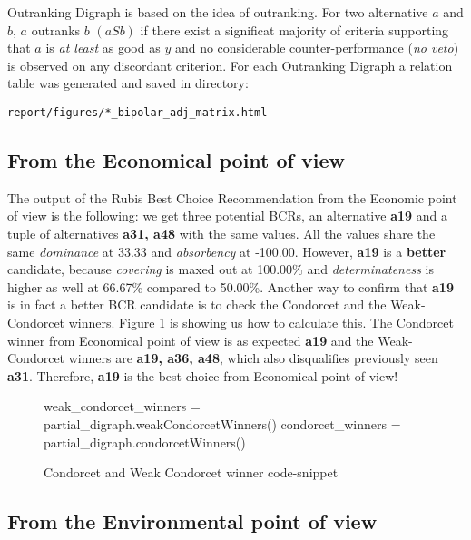 \documentclass[a4paper]{article}
\begin{document}
Outranking Digraph is based on the idea of outranking. For two alternative $a$ and $b$, $a$ outranks $b$ $(a S b)$ if there exist a significat majority of criteria supporting that $a$ is \emph{at least} as good as $y$ and no considerable counter-performance (\emph{no veto}) is observed on any discordant criterion. For each Outranking Digraph a relation table was generated and saved in directory:

\texttt{report/figures/*\_bipolar\_adj\_matrix.html} 

\subsection{From the Economical point of view}

The output of the Rubis Best Choice Recommendation from the Economic point of view is the following: we get three potential BCRs, an alternative \textbf{a19} and a tuple of alternatives \textbf{a31, a48} with the same values. All the values share the same \emph{dominance} at 33.33 and \emph{absorbency} at -100.00. However, \textbf{a19} is a \textbf{better} candidate, because \emph{covering} is maxed out at 100.00\% and \emph{determinateness} is higher as well at 66.67\% compared to 50.00\%. Another way to confirm that \textbf{a19} is in fact a better BCR candidate is to check the Condorcet and the Weak-Condorcet winners. Figure \ref{lst:condo} is showing us how to calculate this. The Condorcet winner from Economical point of view is as expected \textbf{a19} and the Weak-Condorcet winners are \textbf{a19, a36, a48}, which also disqualifies previously seen \textbf{a31}. Therefore, \textbf{a19} is the best choice from Economical point of view!

\begin{figure}[H]
	\begin{center}
		\begin{python}
weak_condorcet_winners = partial_digraph.weakCondorcetWinners()
condorcet_winners      = partial_digraph.condorcetWinners()
		\end{python}
	\end{center}
	\caption{Condorcet and Weak Condorcet winner code-snippet}
	\label{lst:condo}
\end{figure}

\subsection{From the Environmental point of view}
\end{document}
